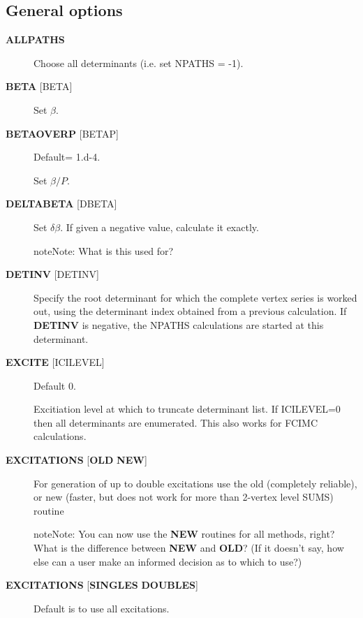 \documentclass[openany,a4paper,10pt,english]{manual}
\begin{document}
\subsection{General options}
\begin{description}
\item[\textbf{ALLPATHS}] \leavevmode
Choose all determinants (i.e. set NPATHS = -1).

\item[\textbf{BETA} {[}BETA{]}] \leavevmode
Set $\beta$.

\item[\textbf{BETAOVERP} {[}BETAP{]}] \leavevmode
Default= 1.d-4.

Set $\beta/P$.

\item[\textbf{DELTABETA} {[}DBETA{]}] \leavevmode
Set $\delta\beta$.  If given a negative value, calculate it exactly.

\begin{notice}{note}{Note:}
What is this used for?
\end{notice}

\item[\textbf{DETINV} {[}DETINV{]}] \leavevmode
Specify the root determinant for which the complete vertex series is
worked out, using the determinant index obtained from a previous
calculation.  If \textbf{DETINV} is negative, the NPATHS calculations
are started at this determinant.

\item[\textbf{EXCITE} {[}ICILEVEL{]}] \leavevmode
Default 0.

Excitiation level at which to truncate determinant list.  If ICILEVEL=0
then all determinants are enumerated.
This also works for FCIMC calculations.

\item[\textbf{EXCITATIONS} {[}\textbf{OLD} \textbf{NEW}{]}] \leavevmode
For generation of up to double excitations use the old (completely
reliable), or new (faster, but does not work for more than 2-vertex
level SUMS) routine

\begin{notice}{note}{Note:}
You can now use the \textbf{NEW} routines for all methods, right?
What is the difference between \textbf{NEW} and \textbf{OLD}?  (If it doesn't say, how else
can a user make an informed decision as to which to use?)
\end{notice}

\item[\textbf{EXCITATIONS} {[}\textbf{SINGLES} \textbf{DOUBLES}{]}] \leavevmode
Default is to use all excitations.


\end{description}
\end{document}

